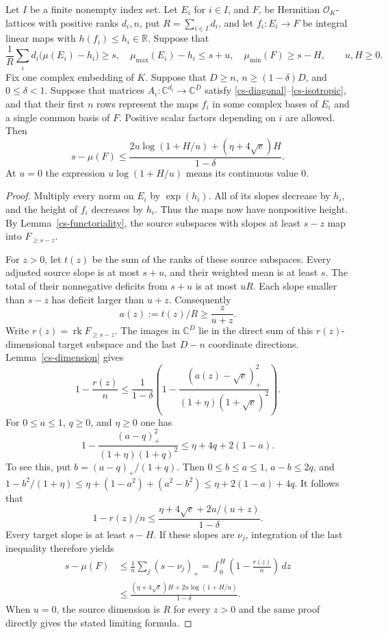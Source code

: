 \begin{proposition}\label{cs-slope}
Let $I$ be a finite nonempty index set. Let $E_i$ for $i\in I$, and $F$,
be Hermitian $\mathcal O_K$-lattices with positive ranks
$d_i,n$, put $R=\sum_{i\in I}d_i$, and let $f_i:E_i\to F$ be integral linear maps with
$h(f_i)\le h_i\in\mathbb R$. Suppose that
\begin{equation}\label{cs-numerical}
 \frac1R\sum_i d_i\bigl(\mu(E_i)-h_i\bigr)\ge s,
 \quad \mu_{\max}(E_i)-h_i\le s+u,
 \quad \mu_{\min}(F)\ge s-H,
 \qquad u,H\ge0.
\end{equation}
Fix one complex embedding of $K$. Suppose that $D\ge n$,
$n\ge(1-\delta)D$, and $0\le\delta<1$. Suppose that matrices
$A_i:\mathbb C^{d_i}\to\mathbb C^D$ satisfy
\eqref{cs-diagonal}--\eqref{cs-isotropic}, and that their first $n$ rows
represent the maps $f_i$ in some complex bases of $E_i$ and a single
common basis of $F$. Positive scalar factors depending on $i$ are allowed.
Then
\begin{equation}\label{cs-slope-bound}
 s-\mu(F)\le\frac{2u\log(1+H/u)+(\eta+4\sqrt e)H}{1-\delta}.
\end{equation}
At $u=0$ the expression $u\log(1+H/u)$ means its continuous value $0$.
\end{proposition}
\begin{proof}
Multiply every norm on $E_i$ by $\exp(h_i)$. All of its slopes decrease
by $h_i$, and the height of $f_i$ decreases by $h_i$. Thus the maps now
have nonpositive height. By Lemma~\ref{cs-functoriality}, the source
subspaces with slopes at least $s-z$ map into $F_{\ge s-z}$.

For $z>0$, let $t(z)$ be the sum of the ranks of these source subspaces.
Every adjusted source slope is at most $s+u$, and their weighted mean is
at least $s$. The total of their nonnegative deficits from $s+u$ is at
most $uR$. Each slope smaller than $s-z$ has deficit larger than $u+z$.
Consequently
\[
 a(z):=t(z)/R\ge\frac z{u+z}.
\]
Write $r(z)=\operatorname{rk}F_{\ge s-z}$. The images in $\mathbb C^D$
lie in the direct sum of this $r(z)$-dimensional target subspace and the
last $D-n$ coordinate directions. Lemma~\ref{cs-dimension} gives
\[
 1-\frac{r(z)}n\le\frac1{1-\delta}
 \left(1-\frac{(a(z)-\sqrt e)_+^2}
 {(1+\eta)(1+\sqrt e)^2}\right).
\]
For $0\le a\le1$, $q\ge0$, and $\eta\ge0$ one has
\[
 1-\frac{(a-q)_+^2}{(1+\eta)(1+q)^2}
 \le\eta+4q+2(1-a).
\]
To see this, put $b=(a-q)_+/(1+q)$. Then $0\le b\le a\le1$,
$a-b\le2q$, and
$1-b^2/(1+\eta)\le\eta+(1-a^2)+(a^2-b^2)
\le\eta+2(1-a)+4q$.
It follows that
\[
 1-r(z)/n\le\frac{\eta+4\sqrt e+2u/(u+z)}{1-\delta}.
\]
Every target slope is at least $s-H$. If these slopes are $\nu_j$,
integration of the last inequality therefore yields
\begin{align*}
 s-\mu(F)&\le\frac1n\sum_j(s-\nu_j)_+
   =\int_0^H\left(1-\frac{r(z)}n\right)\,dz\\
 &\le\frac{(\eta+4\sqrt e)H+2u\log(1+H/u)}{1-\delta}.
\end{align*}
When $u=0$, the source dimension is $R$ for every $z>0$ and the same
proof directly gives the stated limiting formula.
\end{proof}

